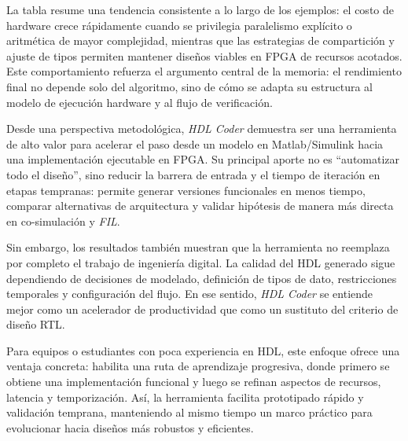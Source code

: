 La tabla resume una tendencia consistente a lo largo de los ejemplos: el costo de hardware crece rápidamente cuando se privilegia paralelismo explícito o aritmética de mayor complejidad, mientras que las estrategias de compartición y ajuste de tipos permiten mantener diseños viables en FPGA de recursos acotados. Este comportamiento refuerza el argumento central de la memoria: el rendimiento final no depende solo del algoritmo, sino de cómo se adapta su estructura al modelo de ejecución hardware y al flujo de verificación.

Desde una perspectiva metodológica, \textit{HDL Coder} demuestra ser una herramienta de alto valor para acelerar el paso desde un modelo en Matlab/Simulink hacia una implementación ejecutable en FPGA. Su principal aporte no es ``automatizar todo el diseño'', sino reducir la barrera de entrada y el tiempo de iteración en etapas tempranas: permite generar versiones funcionales en menos tiempo, comparar alternativas de arquitectura y validar hipótesis de manera más directa en co-simulación y \textit{FIL}.

Sin embargo, los resultados también muestran que la herramienta no reemplaza por completo el trabajo de ingeniería digital. La calidad del HDL generado sigue dependiendo de decisiones de modelado, definición de tipos de dato, restricciones temporales y configuración del flujo. En ese sentido, \textit{HDL Coder} se entiende mejor como un acelerador de productividad que como un sustituto del criterio de diseño RTL.

Para equipos o estudiantes con poca experiencia en HDL, este enfoque ofrece una ventaja concreta: habilita una ruta de aprendizaje progresiva, donde primero se obtiene una implementación funcional y luego se refinan aspectos de recursos, latencia y temporización. Así, la herramienta facilita prototipado rápido y validación temprana, manteniendo al mismo tiempo un marco práctico para evolucionar hacia diseños más robustos y eficientes.
